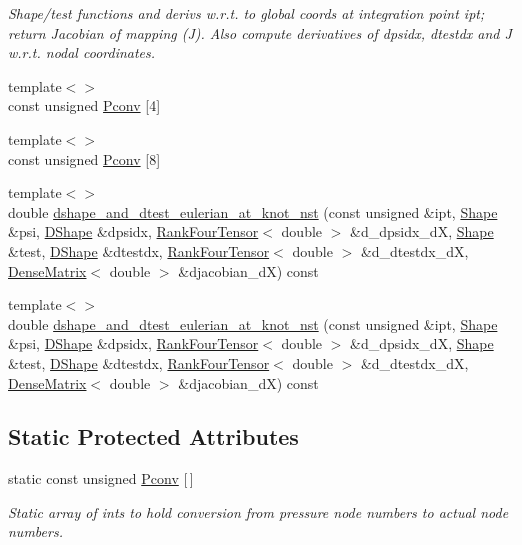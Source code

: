 \begin{DoxyCompactItemize}
\begin{DoxyCompactList}\small\item\em Shape/test functions and derivs w.\+r.\+t. to global coords at integration point ipt; return Jacobian of mapping (J). Also compute derivatives of dpsidx, dtestdx and J w.\+r.\+t. nodal coordinates. \end{DoxyCompactList}\item 
{\footnotesize template$<$$>$ }\\const unsigned \hyperlink{classoomph_1_1QTaylorHoodElement_aae4914bdf9325f6f4309e87651bb3acb}{Pconv} \mbox{[}4\mbox{]}
\item 
{\footnotesize template$<$$>$ }\\const unsigned \hyperlink{classoomph_1_1QTaylorHoodElement_a6ea5227ee36c770ef52601a237e89caf}{Pconv} \mbox{[}8\mbox{]}
\item 
{\footnotesize template$<$$>$ }\\double \hyperlink{classoomph_1_1QTaylorHoodElement_abdb8ec3adc8877c83442269528f51ac3}{dshape\+\_\+and\+\_\+dtest\+\_\+eulerian\+\_\+at\+\_\+knot\+\_\+nst} (const unsigned \&ipt, \hyperlink{classoomph_1_1Shape}{Shape} \&psi, \hyperlink{classoomph_1_1DShape}{D\+Shape} \&dpsidx, \hyperlink{classoomph_1_1RankFourTensor}{Rank\+Four\+Tensor}$<$ double $>$ \&d\+\_\+dpsidx\+\_\+dX, \hyperlink{classoomph_1_1Shape}{Shape} \&test, \hyperlink{classoomph_1_1DShape}{D\+Shape} \&dtestdx, \hyperlink{classoomph_1_1RankFourTensor}{Rank\+Four\+Tensor}$<$ double $>$ \&d\+\_\+dtestdx\+\_\+dX, \hyperlink{classoomph_1_1DenseMatrix}{Dense\+Matrix}$<$ double $>$ \&djacobian\+\_\+dX) const
\item 
{\footnotesize template$<$$>$ }\\double \hyperlink{classoomph_1_1QTaylorHoodElement_ad55f9bb30100dcc6b6b69eeec7cf4c06}{dshape\+\_\+and\+\_\+dtest\+\_\+eulerian\+\_\+at\+\_\+knot\+\_\+nst} (const unsigned \&ipt, \hyperlink{classoomph_1_1Shape}{Shape} \&psi, \hyperlink{classoomph_1_1DShape}{D\+Shape} \&dpsidx, \hyperlink{classoomph_1_1RankFourTensor}{Rank\+Four\+Tensor}$<$ double $>$ \&d\+\_\+dpsidx\+\_\+dX, \hyperlink{classoomph_1_1Shape}{Shape} \&test, \hyperlink{classoomph_1_1DShape}{D\+Shape} \&dtestdx, \hyperlink{classoomph_1_1RankFourTensor}{Rank\+Four\+Tensor}$<$ double $>$ \&d\+\_\+dtestdx\+\_\+dX, \hyperlink{classoomph_1_1DenseMatrix}{Dense\+Matrix}$<$ double $>$ \&djacobian\+\_\+dX) const
\end{DoxyCompactItemize}
\subsection*{Static Protected Attributes}
\begin{DoxyCompactItemize}
\item 
static const unsigned \hyperlink{classoomph_1_1QTaylorHoodElement_a8756ec8b57d66a6c2e1feb8f7b264b03}{Pconv} \mbox{[}$\,$\mbox{]}
\begin{DoxyCompactList}\small\item\em Static array of ints to hold conversion from pressure node numbers to actual node numbers. \end{DoxyCompactList}\end{DoxyCompactItemize}
